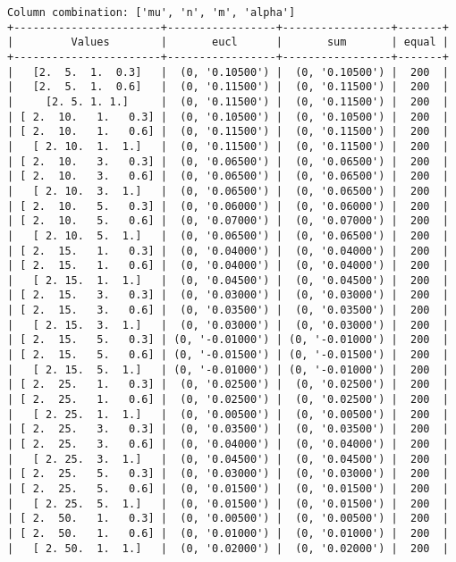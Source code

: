 \documentclass{article}
\begin{document}
\begin{verbatim}
Column combination: ['mu', 'n', 'm', 'alpha']
+-----------------------+-----------------+-----------------+-------+
|         Values        |       eucl      |       sum       | equal |
+-----------------------+-----------------+-----------------+-------+
|   [2.  5.  1.  0.3]   |  (0, '0.10500') |  (0, '0.10500') |  200  |
|   [2.  5.  1.  0.6]   |  (0, '0.11500') |  (0, '0.11500') |  200  |
|     [2. 5. 1. 1.]     |  (0, '0.11500') |  (0, '0.11500') |  200  |
| [ 2.  10.   1.   0.3] |  (0, '0.10500') |  (0, '0.10500') |  200  |
| [ 2.  10.   1.   0.6] |  (0, '0.11500') |  (0, '0.11500') |  200  |
|   [ 2. 10.  1.  1.]   |  (0, '0.11500') |  (0, '0.11500') |  200  |
| [ 2.  10.   3.   0.3] |  (0, '0.06500') |  (0, '0.06500') |  200  |
| [ 2.  10.   3.   0.6] |  (0, '0.06500') |  (0, '0.06500') |  200  |
|   [ 2. 10.  3.  1.]   |  (0, '0.06500') |  (0, '0.06500') |  200  |
| [ 2.  10.   5.   0.3] |  (0, '0.06000') |  (0, '0.06000') |  200  |
| [ 2.  10.   5.   0.6] |  (0, '0.07000') |  (0, '0.07000') |  200  |
|   [ 2. 10.  5.  1.]   |  (0, '0.06500') |  (0, '0.06500') |  200  |
| [ 2.  15.   1.   0.3] |  (0, '0.04000') |  (0, '0.04000') |  200  |
| [ 2.  15.   1.   0.6] |  (0, '0.04000') |  (0, '0.04000') |  200  |
|   [ 2. 15.  1.  1.]   |  (0, '0.04500') |  (0, '0.04500') |  200  |
| [ 2.  15.   3.   0.3] |  (0, '0.03000') |  (0, '0.03000') |  200  |
| [ 2.  15.   3.   0.6] |  (0, '0.03500') |  (0, '0.03500') |  200  |
|   [ 2. 15.  3.  1.]   |  (0, '0.03000') |  (0, '0.03000') |  200  |
| [ 2.  15.   5.   0.3] | (0, '-0.01000') | (0, '-0.01000') |  200  |
| [ 2.  15.   5.   0.6] | (0, '-0.01500') | (0, '-0.01500') |  200  |
|   [ 2. 15.  5.  1.]   | (0, '-0.01000') | (0, '-0.01000') |  200  |
| [ 2.  25.   1.   0.3] |  (0, '0.02500') |  (0, '0.02500') |  200  |
| [ 2.  25.   1.   0.6] |  (0, '0.02500') |  (0, '0.02500') |  200  |
|   [ 2. 25.  1.  1.]   |  (0, '0.00500') |  (0, '0.00500') |  200  |
| [ 2.  25.   3.   0.3] |  (0, '0.03500') |  (0, '0.03500') |  200  |
| [ 2.  25.   3.   0.6] |  (0, '0.04000') |  (0, '0.04000') |  200  |
|   [ 2. 25.  3.  1.]   |  (0, '0.04500') |  (0, '0.04500') |  200  |
| [ 2.  25.   5.   0.3] |  (0, '0.03000') |  (0, '0.03000') |  200  |
| [ 2.  25.   5.   0.6] |  (0, '0.01500') |  (0, '0.01500') |  200  |
|   [ 2. 25.  5.  1.]   |  (0, '0.01500') |  (0, '0.01500') |  200  |
| [ 2.  50.   1.   0.3] |  (0, '0.00500') |  (0, '0.00500') |  200  |
| [ 2.  50.   1.   0.6] |  (0, '0.01000') |  (0, '0.01000') |  200  |
|   [ 2. 50.  1.  1.]   |  (0, '0.02000') |  (0, '0.02000') |  200  |

\end{verbatim}
\end{document}
